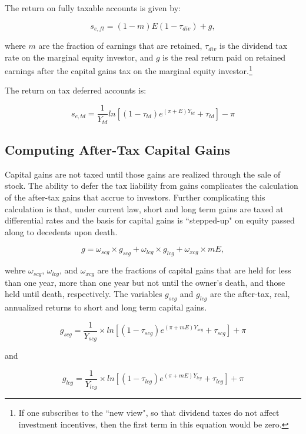 \documentclass[article,11pt,letterpaper,fleqn]{article}
\theoremstyle{definition}
\numberwithin{equation}{section}
\begin{document}
The return on fully taxable accounts is given by:

\begin{equation}
s_{e,ft} = (1-m)E(1-\tau_{div}) + g,
\end{equation}

\noindent\noindent where $m$ are the fraction of earnings that are retained, $\tau_{div}$ is the dividend tax rate on the marginal equity investor, and $g$ is the real return paid on retained earnings after the capital gains tax on the marginal equity investor.\footnote{If one subscribes to the ``new view", so that dividend taxes do not affect investment incentives, then the first term in this equation would be zero.}
 
 The return on tax deferred accounts is:
 
 \begin{equation}
s_{e,td} = \frac{1}{Y_{td}}ln \left[(1-\tau_{td})e^{(\pi+E)Y_{td}}+\tau_{td}\right]-\pi
\end{equation}
 

\subsection{Computing After-Tax Capital Gains}

Capital gains are not taxed until those gains are realized through the sale of stock.  The ability to defer the tax liability from gains complicates the calculation of the after-tax gains that accrue to investors. Further complicating this calculation is that, under current law, short and long term gains are taxed at differential rates and the basis for capital gains is ``stepped-up" on equity passed along to decedents upon death.  

\begin{equation}
g = \omega_{scg}\times g_{scg} + \omega_{lcg}\times g_{lcg} + \omega_{xcg}\times mE,
\end{equation}
 
 \noindent\noindent wehre $\omega_{scg}$, $\omega_{lcg}$, and $\omega_{xcg}$ are the fractions of capital gains that are held for less than one year, more than one year but not until the owner's death, and those held until death, respectively.  The variables $g_{scg}$ and $g_{lcg}$ are the after-tax, real, annualized returns to short and long term capital gains.
 
\begin{equation}
g_{scg} = \frac{1}{Y_{scg}}\times ln\left[(1-\tau_{scg})e^{(\pi+mE)Y_{scg}}+\tau_{scg}\right]+\pi
\end{equation}

\noindent\noindent and

\begin{equation}
g_{lcg} = \frac{1}{Y_{lcg}}\times ln\left[(1-\tau_{lcg})e^{(\pi+mE)Y_{lcg}}+\tau_{lcg}\right]+\pi
\end{equation}


\end{document}
